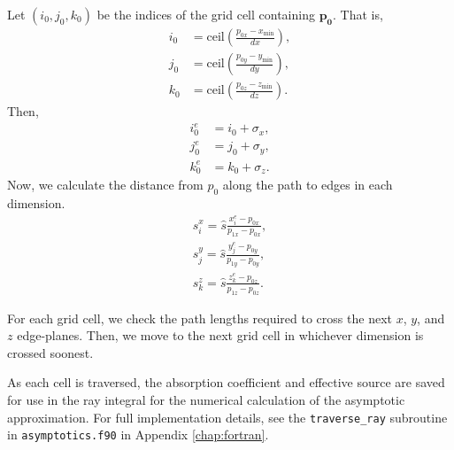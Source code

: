 \documentclass[ms,cpyr,lof,lot]{uathesis}
\newcommand\xmin{{x_{\min}}}
\newcommand\ymin{{y_{\min}}}
\newcommand\zmin{{z_{\min}}}
\newcommand{\ceil}{\mbox{ceil}}
\renewcommand\vec\bm
\begin{document}
Let $(i_0, j_0, k_0)$ be the indices of the grid cell containing $\vec{p_0}$.
That is,
\begin{align}
  i_0 &= \ceil\left(\frac{p_{0x}-\xmin}{dx}\right), \\
  j_0 &= \ceil\left(\frac{p_{0y}-\ymin}{dy}\right), \\
  k_0 &= \ceil\left(\frac{p_{0z}-\zmin}{dz}\right).
\end{align}
Then,
\begin{align}
  i_0^e &= i_0 + \sigma_x, \\
  j_0^e &= j_0 + \sigma_y, \\
  k_0^e &= k_0 + \sigma_z.
\end{align}
Now, we calculate the distance from $p_0$ along the path to edges in each dimension.
\begin{align}
  s_i^x = \hat{s}\frac{x_i^e-p_{0x}}{p_{1x}-p_{0x}}, \\
  s_j^y = \hat{s}\frac{y_j^e-p_{0y}}{p_{1y}-p_{0y}}, \\
  s_k^z = \hat{s}\frac{z_k^e-p_{0z}}{p_{1z}-p_{0z}}.
\end{align}

For each grid cell, we check the path lengths
required to cross the next $x$, $y$, and $z$ edge-planes.
Then, we move to the next grid cell in whichever dimension
is crossed soonest.

As each cell is traversed, the absorption coefficient and effective source are saved for use in the ray integral for the numerical calculation of the asymptotic approximation.
For full implementation details, see the \texttt{traverse\_ray} subroutine in \texttt{asymptotics.f90} in Appendix \ref{chap:fortran}.
\end{document}
